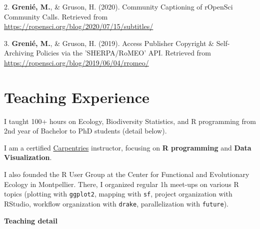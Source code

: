 \documentclass[10pt,a4paper,]{article}
\begin{document}
\leavevmode\hypertarget{ref-Grenie_Community_2020}{}%
2. \textbf{Grenié, M.}, \& Gruson, H. (2020). Community Captioning of
rOpenSci Community Calls. Retrieved from
\url{https://ropensci.org/blog/2020/07/15/subtitles/}

\leavevmode\hypertarget{ref-Grenie_Access_2019}{}%
3. \textbf{Grenié, M.}, \& Gruson, H. (2019). Access Publisher Copyright
\& Self-Archiving Policies via the 'SHERPA/RoMEO' API. Retrieved from
\url{https://ropensci.org/blog/2019/06/04/rromeo/}

\hypertarget{teaching-experience}{%
\section{Teaching Experience}\label{teaching-experience}}

I taught 100+ hours on Ecology, Biodiversity Statistics, and R
programming from 2nd year of Bachelor to PhD students (detail below).

I am a certified \href{https://carpentries.org/}{Carpentries}
instructor, focusing on \textbf{R programming} and \textbf{Data
Visualization}.

I also founded the R User Group at the Center for Functional and
Evolutionary Ecology in Montpellier. There, I organized regular 1h
meet-ups on various R topics (plotting with \texttt{ggplot2}, mapping
with \texttt{sf}, project organization with RStudio, workflow
organization with \texttt{drake}, parallelization with \texttt{future}).

\textbf{Teaching detail}
\end{document}
